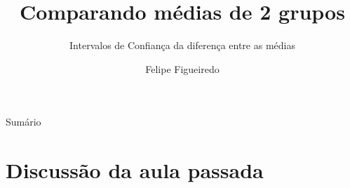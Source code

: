 \documentclass{beamer}
\title%
{Comparando médias de 2 grupos}
\subtitle
{Intervalos de Confiança da diferença entre as médias} %
\author%
{Felipe Figueiredo}%
\institute[] %
{
}
\date%
{}
\begin{document}
\begin{frame}
  \titlepage
\end{frame}

\begin{frame}{Sumário}
  \tableofcontents
\end{frame}








\section{Discussão da aula passada}
\end{document}
